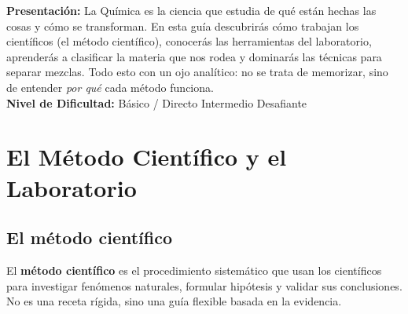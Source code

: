 \documentclass[12pt, a4paper]{article}
\begin{document}


\vspace{4pt}
\begin{cuadroinfo}
\small
\textbf{Presentación:} La Química es la ciencia que estudia de qué están hechas las cosas y cómo se transforman. En esta guía descubrirás cómo trabajan los científicos (el método científico), conocerás las herramientas del laboratorio, aprenderás a clasificar la materia que nos rodea y dominarás las técnicas para separar mezclas. Todo esto con un ojo analítico: no se trata de memorizar, sino de entender \emph{por qué} cada método funciona.
\\[4pt]
\textbf{Nivel de Dificultad:}\quad
\facil{} Básico / Directo \quad
\medio{} Intermedio \quad
\dificil{} Desafiante
\end{cuadroinfo}

\vspace{8pt}

\section{El Método Científico y el Laboratorio}

\subsection{El método científico}

El \textbf{método científico} es el procedimiento sistemático que usan los científicos para investigar fenómenos naturales, formular hipótesis y validar sus conclusiones. No es una receta rígida, sino una guía flexible basada en la evidencia.
\end{document}
